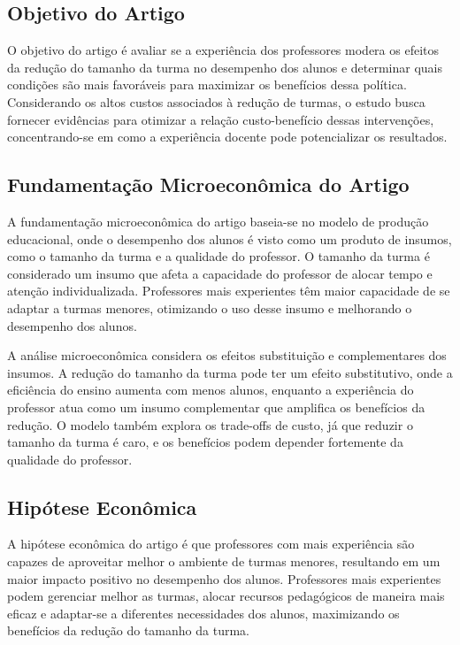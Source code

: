 \documentclass[a4paper,12pt]{article}[abntex2]
\begin{document}
\subsection{\textbf{Objetivo do Artigo}}
O objetivo do artigo é avaliar se a experiência dos professores modera os efeitos da redução do tamanho da turma no desempenho dos alunos e determinar quais condições são mais favoráveis para maximizar os benefícios dessa política. Considerando os altos custos associados à redução de turmas, o estudo busca fornecer evidências para otimizar a relação custo-benefício dessas intervenções, concentrando-se em como a experiência docente pode potencializar os resultados.

\subsection{\textbf{Fundamentação Microeconômica do Artigo}}
A fundamentação microeconômica do artigo baseia-se no modelo de produção educacional, onde o desempenho dos alunos é visto como um produto de insumos, como o tamanho da turma e a qualidade do professor. O tamanho da turma é considerado um insumo que afeta a capacidade do professor de alocar tempo e atenção individualizada. Professores mais experientes têm maior capacidade de se adaptar a turmas menores, otimizando o uso desse insumo e melhorando o desempenho dos alunos.

A análise microeconômica considera os efeitos substituição e complementares dos insumos. A redução do tamanho da turma pode ter um efeito substitutivo, onde a eficiência do ensino aumenta com menos alunos, enquanto a experiência do professor atua como um insumo complementar que amplifica os benefícios da redução. O modelo também explora os trade-offs de custo, já que reduzir o tamanho da turma é caro, e os benefícios podem depender fortemente da qualidade do professor.

\subsection{\textbf{Hipótese Econômica}}
A hipótese econômica do artigo é que professores com mais experiência são capazes de aproveitar melhor o ambiente de turmas menores, resultando em um maior impacto positivo no desempenho dos alunos. Professores mais experientes podem gerenciar melhor as turmas, alocar recursos pedagógicos de maneira mais eficaz e adaptar-se a diferentes necessidades dos alunos, maximizando os benefícios da redução do tamanho da turma.
\end{document}
